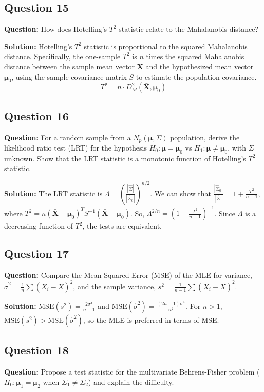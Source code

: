 \subsection*{Question 15}
\textbf{Question:} How does Hotelling's $T^2$ statistic relate to the Mahalanobis distance?

\textbf{Solution:}
Hotelling's $T^2$ statistic is proportional to the squared Mahalanobis distance. Specifically, the one-sample $T^2$ is $n$ times the squared Mahalanobis distance between the sample mean vector $\bar{\mathbf{X}}$ and the hypothesized mean vector $\boldsymbol{\mu}_0$, using the sample covariance matrix $S$ to estimate the population covariance.
$$ T^2 = n \cdot D_M^2(\bar{\mathbf{X}}, \boldsymbol{\mu}_0) $$

\subsection*{Question 16}
\textbf{Question:} For a random sample from a $N_p(\boldsymbol{\mu}, \Sigma)$ population, derive the likelihood ratio test (LRT) for the hypothesis $H_0: \boldsymbol{\mu} = \boldsymbol{\mu}_0$ vs $H_1: \boldsymbol{\mu} \neq \boldsymbol{\mu}_0$, with $\Sigma$ unknown. Show that the LRT statistic is a monotonic function of Hotelling's $T^2$ statistic.

\textbf{Solution:}
The LRT statistic is $\Lambda = \left(\frac{|\hat{\Sigma}|}{|\hat{\Sigma}_0|}\right)^{n/2}$. We can show that $\frac{|\hat{\Sigma}_0|}{|\hat{\Sigma}|} = 1 + \frac{T^2}{n-1}$, where $T^2 = n(\bar{\mathbf{X}}-\boldsymbol{\mu}_0)^T S^{-1} (\bar{\mathbf{X}}-\boldsymbol{\mu}_0)$. So, $\Lambda^{2/n} = \left(1 + \frac{T^2}{n-1}\right)^{-1}$. Since $\Lambda$ is a decreasing function of $T^2$, the tests are equivalent.

\subsection*{Question 17}
\textbf{Question:} Compare the Mean Squared Error (MSE) of the MLE for variance, $\hat{\sigma}^2 = \frac{1}{n}\sum(X_i-\bar{X})^2$, and the sample variance, $s^2 = \frac{1}{n-1}\sum(X_i-\bar{X})^2$.

\textbf{Solution:}
$\text{MSE}(s^2) = \frac{2\sigma^4}{n-1}$ and $\text{MSE}(\hat{\sigma}^2) = \frac{(2n-1)\sigma^4}{n^2}$. For $n>1$, $\text{MSE}(s^2) > \text{MSE}(\hat{\sigma}^2)$, so the MLE is preferred in terms of MSE.

\subsection*{Question 18}
\textbf{Question:} Propose a test statistic for the multivariate Behrens-Fisher problem ($H_0: \boldsymbol{\mu}_1 = \boldsymbol{\mu}_2$ when $\Sigma_1 \neq \Sigma_2$) and explain the difficulty.

